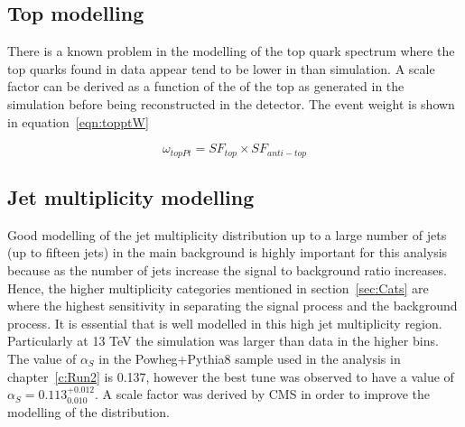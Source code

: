 \subsection{Top \pt modelling}

There is a known problem in the modelling of the top quark \pt spectrum where the top quarks found in data appear tend to be lower in \pt than simulation. A scale factor can be derived as a function of the \pt of the top as generated in the simulation before being reconstructed in the detector. The event weight is shown in equation~\ref{eqn:topptW}

\begin{equation}
\omega_{topPt} = SF_{top}\times SF_{anti-top}
\label{eqn:topptW}
\end{equation}

\subsection{Jet multiplicity modelling}
Good modelling of the jet multiplicity distribution up to a large number of jets (up to fifteen jets) in the main \ttbar background is highly important for this analysis because as the number of jets increase the signal to background ratio increases. Hence, the higher \njets multiplicity categories mentioned in section~\ref{sec:Cats} are where the highest sensitivity in separating the signal \tttt process and the background \ttbar process. It is essential that \ttbar is well modelled in this high jet multiplicity region. 
Particularly at 13 TeV the simulation was larger than data in the higher \njets bins. The value of $\alpha_S$ in the \ttbar Powheg+Pythia8 sample used in the analysis in chapter~\ref{c:Run2} is 0.137, however the best tune was observed to have a value of $\alpha_S=0.113^{+0.012}_{0.010}$. A scale factor was derived by CMS in order to improve the modelling of the \njets distribution. 

